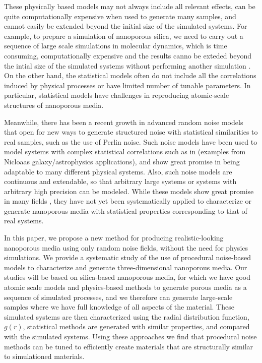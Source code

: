 \documentclass[aps,pre,twocolumn,letterpaper,floatfix,showpacs]{revtex4}
\begin{document}
These physically based models may not always include all relevant effects, can be quite computationally expensive when used to generate many samples, and cannot easily be extended beyond the initial size of the simulated systems. For example, to prepare a simulation of nanoporous silica, we need to carry out a sequence of large scale simulations in molecular dynamics, which is time consuming, computationally expensive and the results canno be exteded beyond the intial size of the simulated systems without performing another simulation \cite{Adarsh}. On the other hand, the statistical models often do not include all the correlations induced by physical processes or have limited number of tunable parameters. In particular, statistical models have challenges in reproducing atomic-scale structures of nanoporous media. 

Meanwhile, there has been a recent growth in advanced random noise models that open for new ways to generate structured noise with statistical similarities to real samples, such as the use of Perlin noise. Such noise models have been used to model systems with complex statistical correlations such as in (examples from Nicloaas galaxy/astrophysics applications), and show great promise in being adaptable to many different physical systems. Also, such noise models are continuous and extendable, so that arbitrary large systems or systems with arbitrary high precision can be modeled. While these models show great promise in many fields \cite{}, they have not yet been systematically applied to characterize or generate nanoporous media with statistical properties corresponding to that of real systems.

In this paper, we propose a new method for producing realistic-looking nanoporous media using only random noise fields, without the need for physics simulations. We provide a systematic study of the use of procedural noise-based models to characterize and generate three-dimensional nanoporous media. Our studies will be based on silica-based nanoporous media, for which we have good atomic scale models and physics-based methods to generate porous media as a sequence of simulated processes, and we therefore can generate large-scale samples where we have full knowledge of all aspects of the material. These simulated systems are then characterized using the radial distribution function, $g(r)$, statistical methods are generated with similar properties, and compared with the simulated systems. Using these approaches we find that procedural noise methods can be tuned to efficiently create materials that are structurally similar to simulationed materials. 
\end{document}
